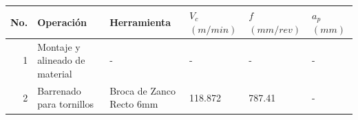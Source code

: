 \begin{table}[H]
\begin{tabular}{|r|p{10.75em}|p{11em}|p{3em}|p{3.25em}|p{3.5em}|}
    \hline  
   \rowcolor[rgb]{ .949,  .949,  .949} \scriptsize\centering\textbf{No.} & \scriptsize\centering\textbf{Operación} & \scriptsize\centering\textbf{Herramienta} & \scriptsize\centering\textbf{$ V_{c} $ $ (m/min) $} & \scriptsize\centering\textbf{$ f $ $ (mm/rev) $} & \scriptsize\textbf{ $ a_{p} $  $ (mm) $ } \\
    \hline
    \scriptsize 1     & \scriptsize Montaje y alineado de material & \scriptsize -     & \scriptsize {-} & \scriptsize{-} & \scriptsize - \\
    \hline
    \scriptsize 2     & \scriptsize Barrenado para tornillos & \scriptsize Broca de Zanco Recto 6mm & \scriptsize 118.872 & \scriptsize 787.41 & \scriptsize - \\
    \hline
    \end{tabular}%
  \label{tab:EL_MC11}%
\end{table}%

